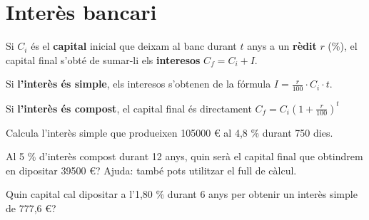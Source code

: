 \begin{mylist}

\end{mylist}

\pagebreak

\section{Interès bancari}

\begin{theorybox}
	Si $C_i$ és el \textbf{capital} inicial que deixam al banc durant $t$ anys a un \textbf{rèdit} $r$ (\%), el capital final s'obté de sumar-li els \textbf{interesos} $C_f = C_i + I$.
	
	Si \textbf{l'interès és simple}, els interesos s'obtenen de la fórmula $I = \frac{r}{100}  \cdot C_i \cdot t $.
	
	Si \textbf{l'interès és compost}, el capital final és directament $C_f=C_i \left( 1 + \frac{r}{100}\right)^t$
\end{theorybox}

\begin{mylist}

\exer
  Calcula l'interès simple que produeixen 105000 \euro{} al 4,8 \%
  durant 750 dies.
  
  
\exer
  Al 5 \% d'interès compost durant 12 anys, quin serà el capital final
  que obtindrem en dipositar 39500 \euro{}? Ajuda: també pots utilitzar
  el full de càlcul.
  
    
\exer
  Quin capital cal dipositar a l'1,80 \% durant 6 anys per obtenir un
  interès simple de 777,6 \euro{}?

\end{mylist}

